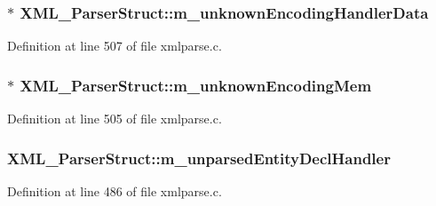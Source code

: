 \subsubsection[{\texorpdfstring{m\+\_\+unknown\+Encoding\+Handler\+Data}{m_unknownEncodingHandlerData}}]{$\ast$ X\+M\+L\+\_\+\+Parser\+Struct\+::m\+\_\+unknown\+Encoding\+Handler\+Data}\hypertarget{struct_x_m_l___parser_struct_a43c2012cd5bd7e22e9d3c5e2904cea8e}{}\label{struct_x_m_l___parser_struct_a43c2012cd5bd7e22e9d3c5e2904cea8e}


Definition at line 507 of file xmlparse.\+c.

\subsubsection[{\texorpdfstring{m\+\_\+unknown\+Encoding\+Mem}{m_unknownEncodingMem}}]{$\ast$ X\+M\+L\+\_\+\+Parser\+Struct\+::m\+\_\+unknown\+Encoding\+Mem}\hypertarget{struct_x_m_l___parser_struct_a33693b74aa56cdf23c77a7240c52d0de}{}\label{struct_x_m_l___parser_struct_a33693b74aa56cdf23c77a7240c52d0de}


Definition at line 505 of file xmlparse.\+c.

\subsubsection[{\texorpdfstring{m\+\_\+unparsed\+Entity\+Decl\+Handler}{m_unparsedEntityDeclHandler}}]{ X\+M\+L\+\_\+\+Parser\+Struct\+::m\+\_\+unparsed\+Entity\+Decl\+Handler}\hypertarget{struct_x_m_l___parser_struct_a9f4c8200eb8dda402236d261adf32b52}{}\label{struct_x_m_l___parser_struct_a9f4c8200eb8dda402236d261adf32b52}


Definition at line 486 of file xmlparse.\+c.

